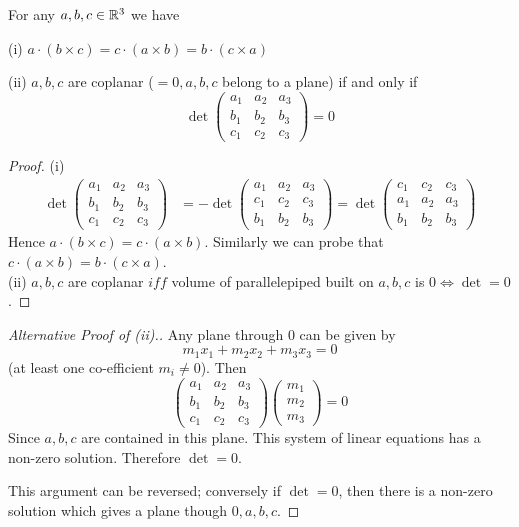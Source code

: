 \documentclass[10pt]{scrartcl}
\begin{document}

\begin{proposition}
For any $a,b,c \in\mathbb{R}^3$ we have 

(i) $a \cdot (b \times c) = c\cdot (a \times b) = b\cdot (c \times a)$

(ii) $a,b,c$ are coplanar ($= 0,a,b,c$ belong to a plane) if and only if 
\[
  \det\begin{pmatrix}
a_1 & a_2 & a_3 \\ b_1 & b_2 & b_3 \\ c_1 & c_2 & c_3 	
\end{pmatrix} = 0
\]
\end{proposition}

\begin{proof}
(i) 
\begin{align*}
  \det\begin{pmatrix}
a_1 & a_2 & a_3 \\ b_1 & b_2 & b_3 \\ c_1 & c_2 & c_3 	
\end{pmatrix} &=   -\det\begin{pmatrix}
a_1 & a_2 & a_3\\ c_1 & c_2 & c_3 	 \\ b_1 & b_2 & b_3 
\end{pmatrix} = \det\begin{pmatrix}
 c_1 & c_2 & c_3\\ a_1 & a_2 & a_3	 \\ b_1 & b_2 & b_3 
\end{pmatrix}
\end{align*}
Hence $a \cdot (b \times c) = c\cdot (a \times b)$. Similarly we can probe that $c \cdot(a \times b) = b\cdot (c \times a)$.\\

(ii) $a,b,c$ are coplanar $iff$ volume of parallelepiped built on $a,b,c$ is $0 \iff \det = 0$.
\end{proof}\vsp

\begin{proof}[Alternative Proof of (ii).]
	Any plane through $0$ can be given by 
	\[
  m_1x_1 + m_2x_2 + m_3x_3 = 0
\]
(at least one co-efficient $m_i \neq 0$). Then 
\[
  \begin{pmatrix}
  	a_1 & a_2 & a_3 \\ b_1 & b_2 & b_3 \\ c_1 & c_2 & c_3 	
  \end{pmatrix}\begin{pmatrix}
	m_1 \\ m_2 \\ m_3
\end{pmatrix} = 0
\]
Since $a,b,c$ are contained in this plane. This system of linear equations has a non-zero solution. Therefore $\det = 0$. 

This argument can be reversed; conversely if $\det = 0$, then there is a non-zero solution which gives a plane though $0,a,b,c$. 
\end{proof}\vsp
\end{document}
